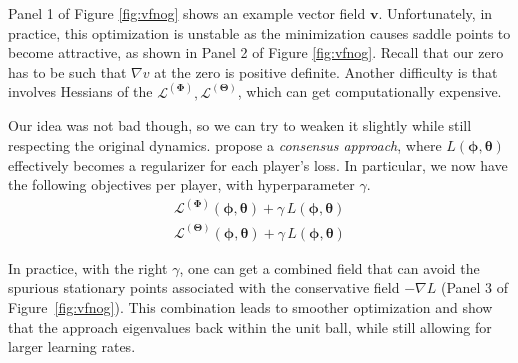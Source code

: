 \documentclass{article}
\renewcommand{\vec}[1]{\ensuremath{\boldsymbol{#1}}}
\newcommand{\btheta}[0]{\ensuremath{\boldsymbol{\theta}}}
\newcommand{\bphi}[0]{\ensuremath{\boldsymbol{\phi}}}
\newcommand{\ltheta}[0]{\ensuremath{\mathcal{L}^{(\boldsymbol{\Theta})}}}
\newcommand{\lphi}[0]{\ensuremath{\mathcal{L}^{(\boldsymbol{\Phi})}}}
\newcommand{\vecfield}{\vec{v}}
\begin{document}
Panel 1 of Figure \ref{fig:vfnog} shows an example vector field $\vecfield$. Unfortunately, in practice, this optimization is unstable as the minimization causes saddle points to become attractive, as shown in Panel 2 of Figure \ref{fig:vfnog}. Recall that our zero has to be such that $\nabla v$ at the zero is positive definite. Another difficulty is that  involves Hessians of the $\lphi, \ltheta$, which can get computationally expensive. %

Our idea was not bad though, so we can try to weaken it slightly while still respecting the original dynamics. \citet{MeschederNG17a} propose a \textit{consensus approach}, where $L(\vec{\phi}, \vec{\theta})$ effectively becomes a regularizer for each player's loss. In particular, we now have the following objectives per player, with hyperparameter $\gamma$.
\begin{align}\label{eq:consensus-optim}
    \lphi(\bphi, \btheta) + \gamma \,L(\vec{\phi}, \vec{\theta})\\
    \ltheta(\bphi, \btheta) + \gamma \, L(\vec{\phi}, \vec{\theta})
\end{align}



In practice, with the right $\gamma$, one can get a combined field that can avoid the spurious stationary points associated with the conservative field $-\nabla L$ (Panel 3 of Figure~\ref{fig:vfnog}). This combination leads to smoother optimization and \citet{MeschederNG17a} show that the approach eigenvalues back within the unit ball, while still allowing for larger learning rates.
\end{document}
